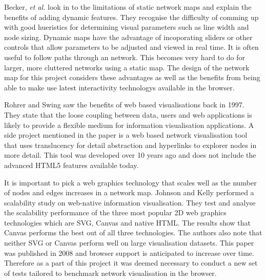 \documentclass{article}
\begin{document}
Becker, \emph{et al.} look in to the limitations of static network maps and
explain the benefits of adding dynamic features.\cite{Becker_1990} They recognise the difficulty
of comming up with good hueristics for determining visual parameters such as
line width and node sizing. Dynamic maps have the advantage of incoporating
sliders or other controls that allow parameters to be adjusted and viewed in
real time. It is often useful to follow paths through an network. This becomes
very hard to do for larger, more cluttered networks using a static map. The
design of the network map for this project considers these advantages as well as
the benefits from being able to make use latest interactivity technologys
available in the browser.


Rohrer and Swing saw the benefits of web based visualisations back in
1997.\cite{Rohrer_1997} They state that the loose coupling between data, users
and web applications is likely to provide a flexible medium for information
visualisation applications.  A side project mentioned in the paper is a web
based network visualisation tool that uses translucency for detail abstraction
and hyperlinks to explorer nodes in more detail. This tool was developed over 10
years ago and does not include the advanced HTML5 features available today.


It is important to pick a web graphics technology that scales well as the number
of nodes and edges increases in a network map. Johnson and Kelly performed a
scalability study on web-native information visualisation.\cite{Johnson_2008}
They test and analyse the scalability performance of the three most popular 2D
web graphics technologies which are SVG, Canvas and native HTML. The results
show that Canvas performs the best out of all three technologies. The authors
also note that neither SVG or Canvas perform well on large visualisation
datasets. This paper was published in 2008 and browser support is anticipated to
increase over time. Therefore as a part of this project it was deemed necessary
to conduct a new set of tests tailored to benchmark network visualisation in the
browser.
\end{document}
